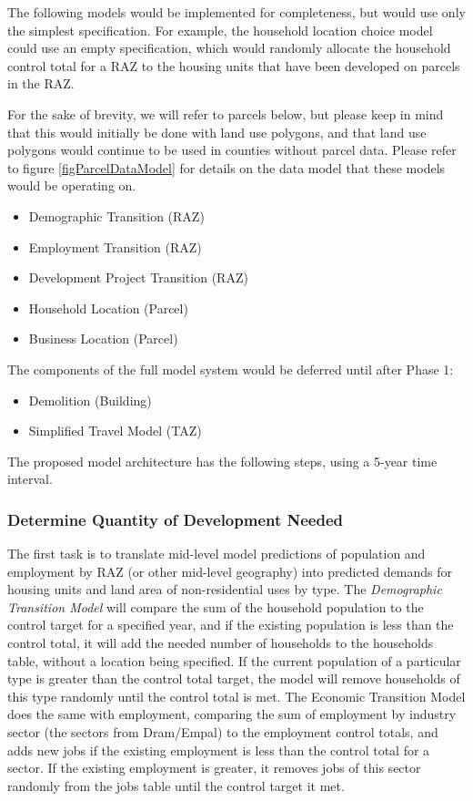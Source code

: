 The following models would be implemented for completeness, but would
use only the simplest specification.  For example,
the household location choice model could use an empty specification,
which would randomly allocate the household control total for a RAZ to
the housing units that have been developed on parcels in the RAZ.

For the sake of brevity, we will refer to parcels below, but please keep in mind
that this would initially be done with land use polygons, and that land use 
polygons would continue to be used in counties without parcel data.  Please refer
to figure \ref{figParcelDataModel} for details on the data model that these models 
would be operating on.

\begin{itemize}
\item Demographic Transition (RAZ)
\item Employment Transition (RAZ)
\item Development Project Transition (RAZ)
\item Household Location (Parcel)
\item Business Location (Parcel)
\end{itemize}

The components of the full model system would be deferred until after Phase 1:

\begin{itemize}
\item Demolition (Building)
\item Simplified Travel Model (TAZ)
\end{itemize}

The proposed model architecture has the following steps, using a 5-year time interval.

\subsubsection{Determine Quantity of Development Needed}

The first task is to translate mid-level model predictions of population and employment by RAZ (or
other mid-level geography) into predicted demands for housing units and land area of non-residential
uses by type. The \emph{Demographic Transition Model} will compare the sum of the household
population to the control target for a specified year, and if the existing population is less than the control
total, it will add the needed number of households to the households table, without a location being specified.
If the current population of a particular type is greater than the control total target, the model will remove
households of this type randomly until the control total is met.
The Economic Transition Model does the same with employment, comparing the sum of employment by
industry sector (the sectors from Dram/Empal) to the employment control totals, and adds new jobs if the
existing employment is less than the control total for a sector.  If the existing employment is greater, it
removes jobs of this sector randomly from the jobs table until the control target it met.

